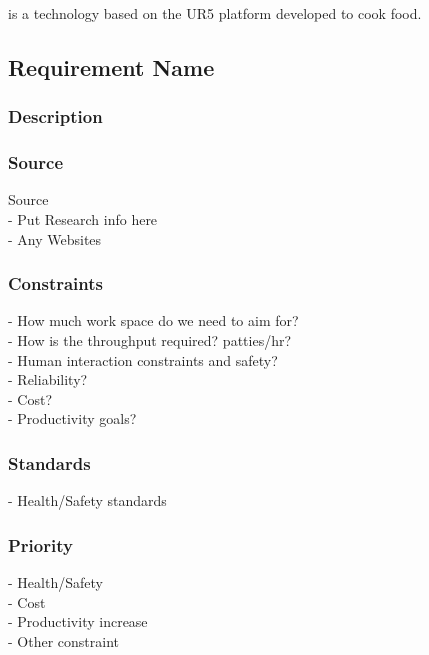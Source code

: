 \productname{} is a technology based on the UR5 platform developed to cook food.

\subsection{Requirement Name}
\subsubsection{Description}

\subsubsection{Source}
Source \\
- Put Research info here\\
- Any Websites
\subsubsection{Constraints}
- How much work space do we need to aim for?\\
- How is the throughput required? patties/hr?\\
- Human interaction constraints and safety?\\
- Reliability? \\
- Cost? \\
- Productivity goals?
\subsubsection{Standards}
- Health/Safety standards\\
\subsubsection{Priority}
- Health/Safety\\
- Cost\\
- Productivity increase \\
- Other constraint\\



